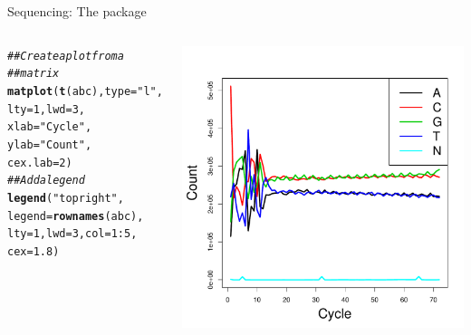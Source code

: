 \documentclass[xcolor=dvipsnames]{beamer}\usepackage[]{graphicx}\usepackage[]{color}
\makeatletter
\newcommand{\hlnum}[1]{\textcolor[rgb]{0.686,0.059,0.569}{#1}}%
\newcommand{\hlstr}[1]{\textcolor[rgb]{0.192,0.494,0.8}{#1}}%
\newcommand{\hlcom}[1]{\textcolor[rgb]{0.678,0.584,0.686}{\textit{#1}}}%
\newcommand{\hlopt}[1]{\textcolor[rgb]{0,0,0}{#1}}%
\newcommand{\hlstd}[1]{\textcolor[rgb]{0.345,0.345,0.345}{#1}}%
\newcommand{\hlkwc}[1]{\textcolor[rgb]{0.333,0.667,0.333}{#1}}%
\newcommand{\hlkwd}[1]{\textcolor[rgb]{0.737,0.353,0.396}{\textbf{#1}}}%
\newenvironment{kframe}{%
 \def\at@end@of@kframe{}%
 \ifinner\ifhmode%
  \def\at@end@of@kframe{\end{minipage}}%
  \begin{minipage}{\columnwidth}%
 \fi\fi%
 \def\FrameCommand##1{\hskip\@totalleftmargin \hskip-\fboxsep
 \colorbox{shadecolor}{##1}\hskip-\fboxsep
     \hskip-\linewidth \hskip-\@totalleftmargin \hskip\columnwidth}%
 \MakeFramed {\advance\hsize-\width
   \@totalleftmargin\z@ \linewidth\hsize
   \@setminipage}}%
 {\par\unskip\endMakeFramed%
 \at@end@of@kframe}
\newenvironment{knitrout}{}{} %
\makeatother
\begin{document}
\begin{frame}[fragile]{Sequencing: The  package}
  \begin{columns}
\begin{knitrout}
\color{fgcolor}\begin{kframe}
\begin{alltt}
\hlcom{## Create a plot from a}
\hlcom{## matrix}
\hlkwd{matplot}\hlstd{(}\hlkwd{t}\hlstd{(abc),} \hlkwc{type}\hlstd{=}\hlstr{"l"}\hlstd{,}
  \hlkwc{lty}\hlstd{=}\hlnum{1}\hlstd{,} \hlkwc{lwd}\hlstd{=}\hlnum{3}\hlstd{,}
  \hlkwc{xlab}\hlstd{=}\hlstr{"Cycle"}\hlstd{,}
  \hlkwc{ylab}\hlstd{=}\hlstr{"Count"}\hlstd{,}
  \hlkwc{cex.lab}\hlstd{=}\hlnum{2}\hlstd{)}
\hlcom{## Add a legend}
\hlkwd{legend}\hlstd{(}\hlstr{"topright"}\hlstd{,}
  \hlkwc{legend}\hlstd{=}\hlkwd{rownames}\hlstd{(abc),}
  \hlkwc{lty}\hlstd{=}\hlnum{1}\hlstd{,} \hlkwc{lwd}\hlstd{=}\hlnum{3}\hlstd{,} \hlkwc{col}\hlstd{=}\hlnum{1}\hlopt{:}\hlnum{5}\hlstd{,}
  \hlkwc{cex}\hlstd{=}\hlnum{1.8}\hlstd{)}
\end{alltt}
\end{kframe}
\end{knitrout}
    \includegraphics[width=\textwidth]{figures/abc}
  \end{columns}
\end{frame}
\end{document}
